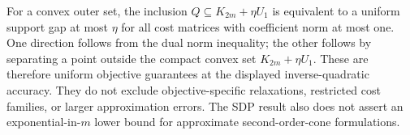 For a convex outer set, the inclusion $Q\subseteq K_{2m}+\eta U_1$
is equivalent to a uniform support gap at most $\eta$ for all cost
matrices with coefficient norm at most one. One direction follows from
the dual norm inequality; the other follows by separating a point
outside the compact convex set $K_{2m}+\eta U_1$. These are therefore
uniform objective guarantees at the displayed inverse-quadratic
accuracy. They do not exclude objective-specific relaxations, restricted
cost families, or larger approximation errors. The SDP result also
does not assert an exponential-in-$m$ lower bound for approximate
second-order-cone formulations.
